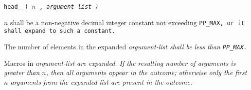
\tt{head_ (} $n$ \tt{,} \it{argument-list} \tt{)}


$n$ shall be a non-negative decimal integer constant not exceeding \tt{PP_MAX},
or it shall expand to such a constant.

The number of elements in the expanded
\it{argument-list} shall be less than \tt{PP_MAX}.


Macros in \it{argument-list} are expanded.
If the resulting number of arguments is greater than $n$,
then all arguments appear in the outcome; otherwise only the first
$n$ arguments from the expanded list are present in the outcome.
